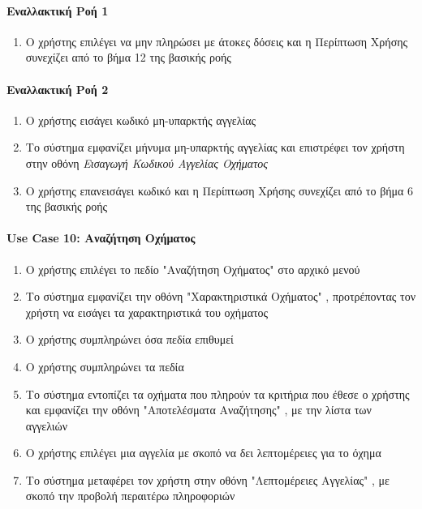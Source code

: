 \documentclass{../ol-softwaremanual}
\begin{document}
	\paragraph{Εναλλακτική Ροή 1}
	\begin{enumerate}
		\item Ο χρήστης επιλέγει να μην πληρώσει με άτοκες δόσεις και η Περίπτωση Χρήσης συνεχίζει από το βήμα 12 της βασικής ροής
	\end{enumerate}
	
	\paragraph{Εναλλακτική Ροή 2}
	\begin{enumerate}
		\item Ο χρήστης εισάγει κωδικό μη-υπαρκτής αγγελίας
		\item Το σύστημα εμφανίζει μήνυμα μη-υπαρκτής αγγελίας και επιστρέφει τον χρήστη στην οθόνη \textit{Εισαγωγή Κωδικού Αγγελίας Οχήματος} 
		\item Ο χρήστης επανεισάγει κωδικό και η Περίπτωση Χρήσης συνεχίζει από το βήμα 6 της βασικής ροής
	\end{enumerate}
	
	\paragraph{\en Use Case 10: \gr Αναζήτηση Οχήματος}  
	\begin{enumerate}
		\item Ο χρήστης επιλέγει το πεδίο \en"\gr Αναζήτηση Οχήματος\en" \gr στο αρχικό μενού
		\item Το σύστημα εμφανίζει την οθόνη \en"\gr Χαρακτηριστικά Οχήματος\en" \gr, προτρέποντας τον χρήστη να εισάγει τα χαρακτηριστικά του οχήματος 
		\item Ο χρήστης συμπληρώνει όσα πεδία επιθυμεί
		\item Ο χρήστης συμπληρώνει τα πεδία
		\item Το σύστημα εντοπίζει τα οχήματα που πληρούν τα κριτήρια που έθεσε ο χρήστης και εμφανίζει την οθόνη \en"\gr Αποτελέσματα Αναζήτησης\en" \gr, με την λίστα των αγγελιών 
		\item Ο χρήστης επιλέγει μια αγγελία με σκοπό να δει λεπτομέρειες για το όχημα
		\item Το σύστημα μεταφέρει τον χρήστη στην οθόνη \en"\gr Λεπτομέρειες Αγγελίας\en" \gr, με σκοπό την προβολή περαιτέρω πληροφοριών
	\end{enumerate}
\end{document}
